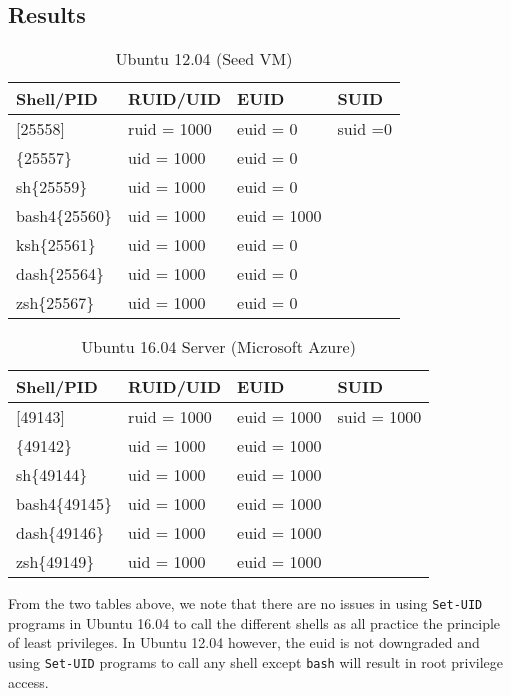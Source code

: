 \documentclass[a4paper,12pt]{article}
\newcommand{\setuid}{\texttt{Set-UID} }
\begin{document}
\subsection{Results}
\begin{table}[h]
	\centering
	\label{sh4.2tab}
	\bgroup
	\def\arraystretch{1.3}
	\begin{tabular}{l|l|l|l}
		Shell/PID      & RUID/UID    & EUID        & SUID    \\ \hline
		{[}25558{]}    & ruid = 1000 & euid = 0    & suid =0 \\ \hline
		\{25557\}      & uid = 1000  & euid = 0    &         \\ \cline{1-3}
		sh\{25559\}    & uid = 1000  & euid = 0    &         \\ \cline{1-3}
		bash4\{25560\} & uid = 1000  & euid = 1000 &         \\ \cline{1-3}
		ksh\{25561\}   & uid = 1000  & euid = 0    &         \\ \cline{1-3}
		dash\{25564\}  & uid = 1000  & euid = 0    &         \\ \cline{1-3}
		zsh\{25567\}   & uid = 1000  & euid = 0    &        
	\end{tabular}
\egroup
	\caption{Ubuntu 12.04 (Seed VM)}
\end{table}
\begin{table}[h]
	\centering
	\label{sh4.3tab}
	\bgroup
	\def\arraystretch{1.3}
	\begin{tabular}{l|l|l|l}
		Shell/PID      & RUID/UID    & EUID        & SUID    \\ \hline
		{[}49143{]}    & ruid = 1000 & euid = 1000 & suid = 1000 \\ \hline
		\{49142\}      & uid = 1000  & euid = 1000 &         \\ \cline{1-3}
		sh\{49144\}    & uid = 1000  & euid = 1000 &         \\ \cline{1-3}
		bash4\{49145\} & uid = 1000  & euid = 1000 &         \\ \cline{1-3}
		dash\{49146\}  & uid = 1000  & euid = 1000 &         \\ \cline{1-3}
		zsh\{49149\}   & uid = 1000  & euid = 1000 &         
	\end{tabular}
\egroup
\caption{Ubuntu 16.04 Server (Microsoft Azure)}
\end{table}
\noindent From the two tables above, we note that there are no issues in using \texttt{Set-UID} programs in Ubuntu 16.04 to call the different shells as all practice the principle of least privileges. In Ubuntu 12.04 however, the euid is not downgraded and using \setuid programs to call any shell except \texttt{bash} will result in root privilege access. 
\end{document}
